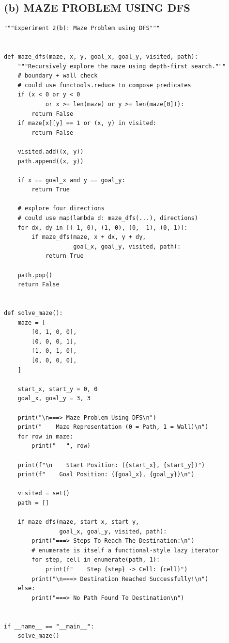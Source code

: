 \documentclass[12pt,a4paper]{article}
\begin{document}
\subsection{(b) MAZE PROBLEM USING DFS}

\begin{lstlisting}[style=pythonstyle]
"""Experiment 2(b): Maze Problem using DFS"""


def maze_dfs(maze, x, y, goal_x, goal_y, visited, path):
    """Recursively explore the maze using depth-first search."""
    # boundary + wall check
    # could use functools.reduce to compose predicates
    if (x < 0 or y < 0
            or x >= len(maze) or y >= len(maze[0])):
        return False
    if maze[x][y] == 1 or (x, y) in visited:
        return False

    visited.add((x, y))
    path.append((x, y))

    if x == goal_x and y == goal_y:
        return True

    # explore four directions
    # could use map(lambda d: maze_dfs(...), directions)
    for dx, dy in [(-1, 0), (1, 0), (0, -1), (0, 1)]:
        if maze_dfs(maze, x + dx, y + dy,
                    goal_x, goal_y, visited, path):
            return True

    path.pop()
    return False


def solve_maze():
    maze = [
        [0, 1, 0, 0],
        [0, 0, 0, 1],
        [1, 0, 1, 0],
        [0, 0, 0, 0],
    ]

    start_x, start_y = 0, 0
    goal_x, goal_y = 3, 3

    print("\n===> Maze Problem Using DFS\n")
    print("    Maze Representation (0 = Path, 1 = Wall)\n")
    for row in maze:
        print("   ", row)

    print(f"\n    Start Position: ({start_x}, {start_y})")
    print(f"    Goal Position: ({goal_x}, {goal_y})\n")

    visited = set()
    path = []

    if maze_dfs(maze, start_x, start_y,
                goal_x, goal_y, visited, path):
        print("===> Steps To Reach The Destination:\n")
        # enumerate is itself a functional-style lazy iterator
        for step, cell in enumerate(path, 1):
            print(f"    Step {step} -> Cell: {cell}")
        print("\n===> Destination Reached Successfully!\n")
    else:
        print("===> No Path Found To Destination\n")


if __name__ == "__main__":
    solve_maze()
\end{lstlisting}
\end{document}
